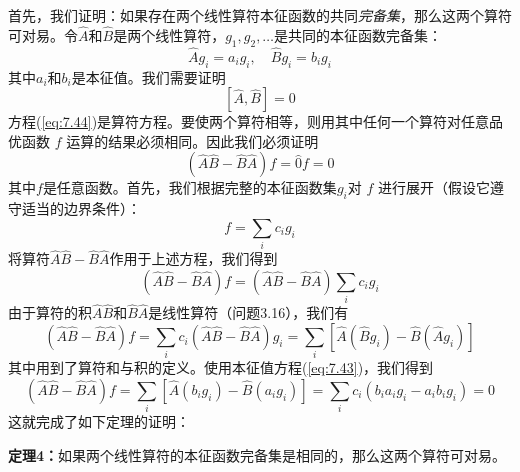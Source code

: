     首先，我们证明：如果存在两个线性算符本征函数的共同\textit{完备集}，那么这两个算符可对易。令$\hat{A}$和$\hat{B}$是两个线性算符，$g_1,g_2,\ldots$是共同的本征函数完备集：
    \begin{equation}
        \hat{A}g_i = a_ig_i, \quad \hat{B}g_i = b_ig_i
        \label{eq:7.43}
    \end{equation}
    其中$a_i$和$b_i$是本征值。我们需要证明
    \begin{equation}
        \left[\hat{A},\hat{B}\right] = 0
        \label{eq:7.44}
    \end{equation}
    方程(\ref{eq:7.44})是算符方程。要使两个算符相等，则用其中任何一个算符对任意品优函数 $f$ 运算的结果必须相同。因此我们必须证明
    \begin{equation*}
        \left(\hat{A}\hat{B} - \hat{B}\hat{A}\right)f = \hat{0}f = 0
    \end{equation*}
    其中$f$是任意函数。首先，我们根据完整的本征函数集$g_i$对 $f$ 进行展开（假设它遵守适当的边界条件）：
    \begin{equation*}
        f = \sum_{i}c_i g_i
    \end{equation*}
    将算符$\hat{A}\hat{B}-\hat{B}\hat{A}$作用于上述方程，我们得到
    \begin{equation*}
        \left(\hat{A}\hat{B} - \hat{B}\hat{A}\right)f = \left(\hat{A}\hat{B} - \hat{B}\hat{A}\right)\sum_{i}c_ig_i
    \end{equation*}
    由于算符的积$\hat{A}\hat{B}$和$\hat{B}\hat{A}$是线性算符（问题3.16），我们有
    \begin{equation*}
        \left(\hat{A}\hat{B}-\hat{B}\hat{A}\right)f = \sum_{i}c_i\left(\hat{A}\hat{B}-\hat{B}\hat{A}\right)g_i = \sum_{i}\left[\hat{A}\left(\hat{B}g_i\right) - \hat{B}\left(\hat{A}g_i\right)\right]
    \end{equation*}
    其中用到了算符和与积的定义。使用本征值方程(\ref{eq:7.43})，我们得到
    \begin{equation*}
        \left(\hat{A}\hat{B}-\hat{B}\hat{A}\right)f = \sum_{i}\left[\hat{A}\left(b_ig_i\right)- \hat{B}\left(a_ig_i\right)\right] = \sum_{i}c_i\left(b_ia_ig_i - a_ib_ig_i\right) = 0
    \end{equation*}
    这就完成了如下定理的证明：
    \begin{center}
        \parbox{0.8\textwidth}{
            \textbf{定理4：}如果两个线性算符的本征函数完备集是相同的，那么这两个算符可对易。
        }
    \end{center}

